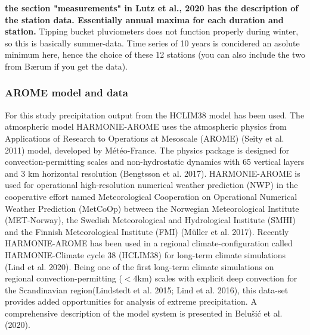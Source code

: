 \textbf{the section "measurements" in Lutz et al., 2020 has the description of the station data. Essentially annual maxima for each duration and station.} Tipping bucket pluviometers does not function properly during winter, so this is basically summer-data. Time series of 10 years is concidered an asolute minimum here, hence the choice of these 12 stations (you can also include the two from Bærum if you get the data). 

\subsubsection{AROME model and data}

For this study precipitation output from the HCLIM38 model has been used.
The atmospheric model HARMONIE-AROME uses the atmospheric physics from Applications of Research to Operations at Mesoscale (AROME) (Seity et al. 2011)\cite{seity_arome} model, developed by Météo-France. The physics package is designed for convection-permitting scales and non-hydrostatic dynamics with 65 vertical layers and 3 km horizontal resolution (Bengtsson et al. 2017)\cite{bengtsson_arome}. HARMONIE-AROME is used for operational high-resolution numerical weather prediction (NWP) in the cooperative effort named Meteorological Cooperation on Operational Numerical Weather Prediction (MetCoOp) between the Norwegian Meteorological Institute (MET-Norway), the Swedish Meteorological and Hydrological Institute (SMHI) and the Finnish Meteorological Institute (FMI) (Müller et al. 2017)\cite{muller}. Recently HARMONIE-AROME has been used in a regional climate-configuration called HARMONIE-Climate cycle 38 (HCLIM38) for long-term climate simulations (Lind et al. 2020)\cite{lind_arome]}. Being one of the first long-term climate simulations on regional convection-permitting ($<$4km) scales with explicit deep convection for the Scandinavian region(Lindstedt et al. 2015\cite{lindstedt_hclim}; Lind et al. 2016\cite{lind_hclim}), this data-set provides added opportunities for analysis of extreme precipitation. A comprehensive description of the model system is presented in Belušić et al.(2020)\cite{belusic_hclim}. 

